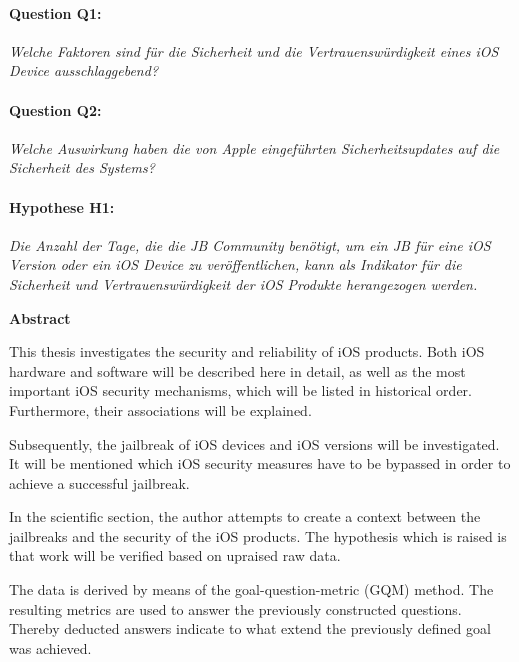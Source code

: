 \paragraph{Question Q1:} \textit{\glqq Welche Faktoren sind für die Sicherheit und die Vertrauenswürdigkeit eines iOS Device ausschlaggebend?\grqq{}}
\paragraph{Question Q2:} \textit{\glqq Welche Auswirkung haben die von Apple eingeführten Sicherheitsupdates auf die Sicherheit des Systems?\grqq{}}        
\paragraph{Hypothese H1:}\textit{\glqq Die Anzahl der Tage, die die JB Community benötigt, um ein JB für eine iOS Version oder ein iOS Device zu veröffentlichen, kann als Indikator für die Sicherheit und Vertrauenswürdigkeit der iOS Produkte herangezogen werden.\grqq{}}




\cleardoublepage


\begin{center}
{\Large\bfseries Abstract}
\end{center}
This thesis investigates the security and reliability of iOS products. Both iOS hardware and software will be described here in detail, as well as the most important iOS security mechanisms, which will be listed in historical order. Furthermore, their associations will be explained.\par
Subsequently, the jailbreak of iOS devices and iOS versions will be investigated. It will be mentioned which iOS security measures have to be bypassed in order to achieve a successful jailbreak.\par
In the scientific section, the author attempts to create a context between the jailbreaks and the security of the iOS products. The hypothesis which is raised is that work will be verified based on upraised raw data.\par
The data is derived by means of the goal-question-metric (GQM) method. The resulting metrics are used to answer the previously constructed questions. Thereby deducted answers indicate to what extend the previously defined goal was achieved.\par


